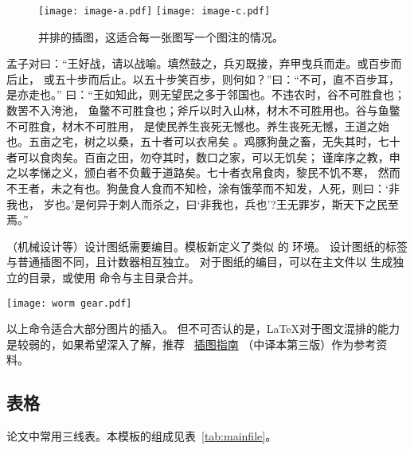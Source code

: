 \begin{figure}[htbp]
	\centering
	{\texttt{[image: image-a.pdf]}}
	\hspace{1cm}
	{\texttt{[image: image-c.pdf]}}
	\caption{并排的插图，这适合每一张图写一个图注的情况。}\label{fig:abreast-image-a-c}
\end{figure}

孟子对曰：“王好战，请以战喻。填然鼓之，兵刃既接，弃甲曳兵而走。或百步而后止，
或五十步而后止。以五十步笑百步，则何如？”曰：“不可，直不百步耳，是亦走也。”
曰：“王如知此，则无望民之多于邻国也。不违农时，谷不可胜食也；数罟不入洿池，
鱼鳖不可胜食也；斧斤以时入山林，材木不可胜用也。谷与鱼鳖不可胜食，材木不可胜用，
是使民养生丧死无憾也。养生丧死无憾，王道之始也。五亩之宅，树之以桑，五十者可以衣帛矣
。鸡豚狗彘之畜，无失其时，七十者可以食肉矣。百亩之田，勿夺其时，数口之家，可以无饥矣；
谨庠序之教，申之以孝悌之义，颁白者不负戴于道路矣。七十者衣帛食肉，黎民不饥不寒，
然而不王者，未之有也。狗彘食人食而不知检，涂有饿莩而不知发，人死，则曰：‘非我也，
岁也。’是何异于刺人而杀之，曰‘非我也，兵也’?王无罪岁，斯天下之民至焉。”

（机械设计等）设计图纸需要编目。模板新定义了类似  的 环境。
设计图纸的标签与普通插图不同，且计数器相互独立。
对于图纸的编目，可以在主文件以  生成独立的目录，或使用
命令与主目录合并。
\begin{dfigure}%
	\centering
	\texttt{[image: worm gear.pdf]}
	\caption{设计图纸示例}  %
\end{dfigure}

以上命令适合大部分图片的插入。
但不可否认的是，\LaTeX{}对于图文混排的能力是较弱的，如果希望深入了解，推荐~
\href{https://github.com/WenboSheng/epslatex-cn}{\LaTeXe 插图指南}
（中译本第三版）作为参考资料。


\subsection{表格}\label{subsec:tab}
论文中常用三线表。本模板的组成见表~\ref{tab:mainfile}。

